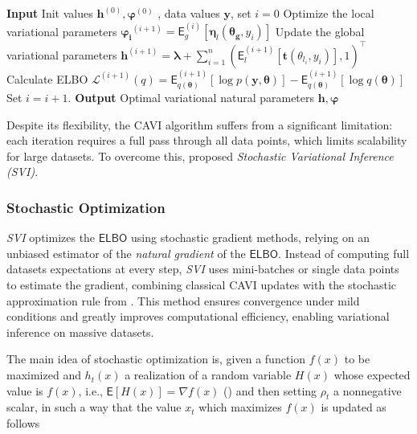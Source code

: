 \begin{algorithm}[H]
\caption{CAVI with conditionally conjugate models}
\begin{algorithmic}
\Statex \textbf{Input} Init values $\bm{h}^{(0)},\bm{\varphi}^{(0)}$ , data values $\bm{y}$, set $i=0$ 
        \State Optimize the local variational parameters $\bm{\varphi_i}^{(i+1)}=\mathsf{E}_{g}^{(i)}\left[\bm{\eta}_l(\bm{\theta_g},y_i)\right]$
    \EndFor
    \State Update the global variational parameters $\bm{h}^{(i+1)}=\bm{\lambda}+\sum_{i=1}^{n}(\mathsf{E}_{l}^{(i+1)}\left[\bm{t}\left(\theta_{l_i},y_i\right)\right],1)^\top$
    \State Calculate ELBO $
    \mathcal{L}^{(i+1)}\left(q\right)
    =
    \mathsf{E}^{(i+1)}_{q(\bm{\theta})}\left[\log p(\bm{y},\bm{\theta})\right]
    -
    \mathsf{E}^{(i+1)}_{q(\bm{\theta})}\left[\log q(\bm{\theta})\right]
    $
    \State Set $i=i+1$.
\EndWhile
\Statex \textbf{Output} Optimal variational natural parameters $\bm{h},\bm{\varphi}$
\end{algorithmic}
\label{CAVI_FEDN_alg}
\end{algorithm}

Despite its flexibility, the \textsf{CAVI} algorithm suffers from a significant limitation: each iteration requires a full pass through all data points, which limits scalability for large datasets. To overcome this, \cite{HOFFMAN} proposed \textit{Stochastic Variational Inference (SVI)}. 

\vspace{0.5cm}

\subsubsection {Stochastic Optimization}

\textit{SVI} optimizes the $\mathsf{ELBO}$ using stochastic gradient methods, relying on an unbiased estimator of the \textit{natural gradient} of the $\mathsf{ELBO}$. Instead of computing full datasets expectations at every step, \textit{SVI} uses mini-batches or single data points to estimate the gradient, combining classical  \textsf{CAVI} updates with the stochastic approximation rule from \cite{Robbins&Monro:1951}. This method ensures convergence under mild conditions and greatly improves computational efficiency, enabling variational inference on massive datasets.

\vspace{0.5cm}

The main idea of stochastic optimization is, given a function $f(x)$ to be maximized and $h_t(x)$ a realization of a random variable $H(x)$ whose expected value is $f(x)$, i.e., $\mathsf{E}\left[H(x)\right]=\nabla f(x)$ (\cite{RANGAN}) and then setting $\rho_t$ a nonnegative scalar, in such a way that the value $x_t$ which maximizes $f(x)$ is updated as follows

